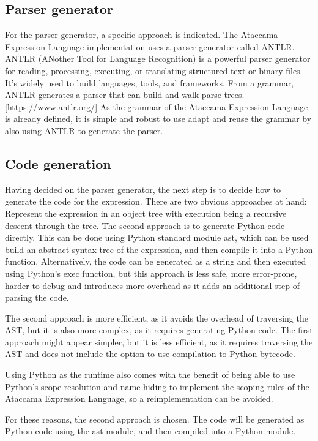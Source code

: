 \subsection{Parser generator}

For the parser generator, a specific approach is indicated. The Ataccama Expression Language implementation uses a parser generator called ANTLR. ANTLR (ANother Tool for Language Recognition) is a powerful parser generator for reading, processing, executing, or translating structured text or binary files. It's widely used to build languages, tools, and frameworks. From a grammar, ANTLR generates a parser that can build and walk parse trees. [https://www.antlr.org/] As the grammar of the Ataccama Expression Language is already defined, it is simple and robust to use adapt and reuse the grammar by also using ANTLR to generate the parser.

\subsection{Code generation}

Having decided on the parser generator, the next step is to decide how to generate the code for the expression. There are two obvious approaches at hand: Represent the expression in an object tree with execution being a recursive descent through the tree. The second approach is to generate Python code directly. This can be done using Python standard module ast, which can be used build an abstract syntax tree of the expression, and then compile it into a Python function. Alternatively, the code can be generated as a string and then executed using Python's exec function, but this approach is less safe, more error-prone, harder to debug and introduces more overhead as it adds an additional step of parsing the code.

The second approach is more efficient, as it avoids the overhead of traversing the AST, but it is also more complex, as it requires generating Python code. The first approach might appear simpler, but it is less efficient, as it requires traversing the AST and does not include the option to use compilation to Python bytecode.

Using Python as the runtime also comes with the benefit of being able to use Python's scope resolution and name hiding to implement the scoping rules of the Ataccama Expression Language, so a reimplementation can be avoided.

For these reasons, the second approach is chosen. The code will be generated as Python code using the ast module, and then compiled into a Python module.

